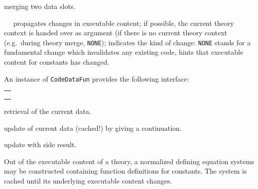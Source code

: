 \begin{isabellebody}
\begin{isamarkuptext}
\begin{description}
  \item {} merging two data slots.

  \item {}~~ propagates changes in executable content;
    if possible, the current theory context is handed over
    as argument  (if there is no current theory context (e.g.~during
    theory merge, \verb|NONE|);  indicates the kind
    of change: \verb|NONE| stands for a fundamental change
    which invalidates any existing code, 
    hints that executable content for constants 
    has changed.

  \end{description}

  An instance of \verb|CodeDataFun| provides the following
  interface:

  \medskip
  \begin{tabular}{l}
  \isa{get{\isacharcolon}\ theory\ {\isasymrightarrow}\ T} \\
  \isa{change{\isacharcolon}\ theory\ {\isasymrightarrow}\ {\isacharparenleft}T\ {\isasymrightarrow}\ T{\isacharparenright}\ {\isasymrightarrow}\ T} \\
  \isa{change{\isacharunderscore}yield{\isacharcolon}\ theory\ {\isasymrightarrow}\ {\isacharparenleft}T\ {\isasymrightarrow}\ {\isacharprime}a\ {\isacharasterisk}\ T{\isacharparenright}\ {\isasymrightarrow}\ {\isacharprime}a\ {\isacharasterisk}\ T}
  \end{tabular}

  \begin{description}

  \item {} retrieval of the current data.

  \item {} update of current data (cached!)
    by giving a continuation.

  \item {} update with side result.

  \end{description}%
\end{isamarkuptext}%
\isamarkuptrue%
%
\isamarkuptrue%
%
\begin{isamarkuptext}%
Out of the executable content of a theory, a normalized
  defining equation systems may be constructed containing
  function definitions for constants.  The system is cached
  until its underlying executable content changes.


\end{isamarkuptext}
\end{isabellebody}
